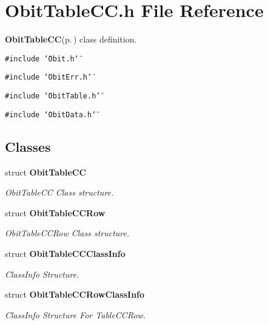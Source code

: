 \section{Obit\-Table\-CC.h File Reference}
\label{ObitTableCC_8h}
{\bf Obit\-Table\-CC}{\rm (p.\,\pageref{structObitTableCC})} class definition. 

{\tt \#include \char`\"{}Obit.h\char`\"{}}\par
{\tt \#include \char`\"{}Obit\-Err.h\char`\"{}}\par
{\tt \#include \char`\"{}Obit\-Table.h\char`\"{}}\par
{\tt \#include \char`\"{}Obit\-Data.h\char`\"{}}\par
\subsection*{Classes}
\begin{CompactItemize}
\item 
struct {\bf Obit\-Table\-CC}
\begin{CompactList}\small\item\em Obit\-Table\-CC Class structure. \item\end{CompactList}\item 
struct {\bf Obit\-Table\-CCRow}
\begin{CompactList}\small\item\em Obit\-Table\-CCRow Class structure. \item\end{CompactList}\item 
struct {\bf Obit\-Table\-CCClass\-Info}
\begin{CompactList}\small\item\em Class\-Info Structure. \item\end{CompactList}\item 
struct {\bf Obit\-Table\-CCRow\-Class\-Info}
\begin{CompactList}\small\item\em Class\-Info Structure For Table\-CCRow. \item\end{CompactList}\end{CompactItemize}
